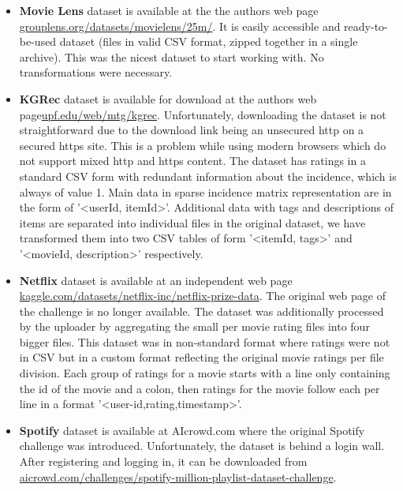 \begin{itemize}
    \item \textbf{Movie Lens} dataset is available at the the authors web page \newline \href{https://grouplens.org/datasets/movielens/25m/}{grouplens.org/datasets/movielens/25m/}. It is easily accessible and ready-to-be-used dataset (files in valid CSV format, zipped together in a single archive). This was the nicest dataset to start working with. No transformations were necessary.
    
    \item \textbf{KGRec} dataset is available for download at the authors web page\newline \href{https://www.upf.edu/web/mtg/kgrec}{upf.edu/web/mtg/kgrec}. Unfortunately, downloading the dataset is not straightforward due to the download link being an unsecured http on a secured https site. This is a problem while using modern browsers which do not support mixed http and https content. The dataset has ratings in a standard CSV form with redundant information about the incidence, which is always of value 1. Main data in sparse incidence matrix representation are in the form of '\textless userId, itemId\textgreater'. Additional data with tags and descriptions of items are separated into individual files in the original dataset, we have transformed them into two CSV tables of form '\textless itemId, tags\textgreater' and '\textless movieId, description\textgreater' respectively.
    
    \item \textbf{Netflix} dataset is available at an independent web page
    \newline
    \href{https://www.kaggle.com/datasets/netflix-inc/netflix-prize-data}{kaggle.com/datasets/netflix-inc/netflix-prize-data}.
    The original web page of the challenge is no longer available. The dataset was additionally processed by the uploader by aggregating the small per movie rating files into four bigger files. This dataset was in non-standard format where ratings were not in CSV but in a custom format reflecting the original movie ratings per file division. Each group of ratings for a movie starts with a line only containing the id of the movie and a colon, then ratings for the movie follow each per line in a format '\textless user-id,rating,timestamp\textgreater'.
    
    \item \textbf{Spotify} dataset is available at AIcrowd.com where the original Spotify challenge was introduced. Unfortunately, the dataset is behind a login wall. After registering and logging in, it can be downloaded from \newline\href{https://www.aicrowd.com/challenges/spotify-million-playlist-dataset-challenge}{aicrowd.com/challenges/spotify-million-playlist-dataset-challenge}.
    \newline
    

\end{itemize}
